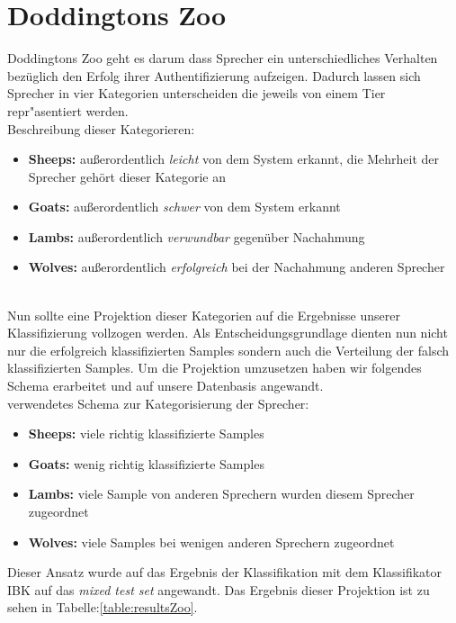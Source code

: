 \section{Doddingtons Zoo}


Doddingtons Zoo
geht es darum dass Sprecher ein unterschiedliches Verhalten bezüglich den Erfolg ihrer Authentifizierung aufzeigen. \cite{zoo}
Dadurch lassen sich Sprecher in vier Kategorien unterscheiden die jeweils von einem Tier repr"asentiert werden. \\

Beschreibung dieser Kategorieren:
\begin{itemize}
	\item[\textbullet]  \textbf{Sheeps:} außerordentlich \textit{leicht} von dem System erkannt, die Mehrheit der Sprecher gehört dieser Kategorie an
	\item[\textbullet]  \textbf{Goats:} außerordentlich \textit{schwer} von dem System erkannt
	\item[\textbullet]  \textbf{Lambs:} außerordentlich \textit{verwundbar} gegenüber Nachahmung
	\item[\textbullet]  \textbf{Wolves:} außerordentlich \textit{erfolgreich} bei der Nachahmung anderen Sprecher
\end{itemize}
\cite{dittmann}\\

Nun sollte eine Projektion dieser Kategorien auf die Ergebnisse unserer Klassifizierung vollzogen werden. Als Entscheidungsgrundlage dienten nun nicht nur die erfolgreich klassifizierten Samples sondern auch die Verteilung der falsch klassifizierten Samples. Um die Projektion umzusetzen haben wir folgendes Schema erarbeitet und auf unsere Datenbasis angewandt.\\

verwendetes Schema zur Kategorisierung der Sprecher:
\begin{itemize}
	\item[\textbullet]  \textbf{Sheeps:} viele richtig klassifizierte Samples
	\item[\textbullet]  \textbf{Goats:} wenig richtig klassifizierte Samples
	\item[\textbullet]  \textbf{Lambs:} viele Sample von anderen Sprechern wurden diesem Sprecher zugeordnet
	\item[\textbullet]  \textbf{Wolves:} viele Samples bei wenigen anderen Sprechern zugeordnet
\end{itemize}

Dieser Ansatz wurde auf das Ergebnis der Klassifikation mit dem Klassifikator IBK auf das \textit{mixed test set} angewandt. Das Ergebnis dieser Projektion ist zu sehen in Tabelle:\ref{table:resultsZoo}.


